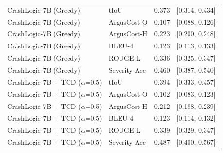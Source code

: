 \begin{tabular}{l l c c}
CrashLogic-7B (Greedy) & tIoU & 0.373 & [0.314, 0.434] \\
CrashLogic-7B (Greedy) & ArgusCost-O & 0.107 & [0.088, 0.126] \\
CrashLogic-7B (Greedy) & ArgusCost-H & 0.223 & [0.200, 0.248] \\
CrashLogic-7B (Greedy) & BLEU-4 & 0.123 & [0.113, 0.133] \\
CrashLogic-7B (Greedy) & ROUGE-L & 0.336 & [0.325, 0.347] \\
CrashLogic-7B (Greedy) & Severity-Acc & 0.460 & [0.387, 0.540] \\
CrashLogic-7B + TCD ($\alpha$=0.5) & tIoU & 0.394 & [0.333, 0.457] \\
CrashLogic-7B + TCD ($\alpha$=0.5) & ArgusCost-O & 0.102 & [0.083, 0.123] \\
CrashLogic-7B + TCD ($\alpha$=0.5) & ArgusCost-H & 0.212 & [0.188, 0.239] \\
CrashLogic-7B + TCD ($\alpha$=0.5) & BLEU-4 & 0.123 & [0.114, 0.132] \\
CrashLogic-7B + TCD ($\alpha$=0.5) & ROUGE-L & 0.339 & [0.329, 0.347] \\
CrashLogic-7B + TCD ($\alpha$=0.5) & Severity-Acc & 0.487 & [0.400, 0.567] \\
\bottomrule
\end{tabular}
